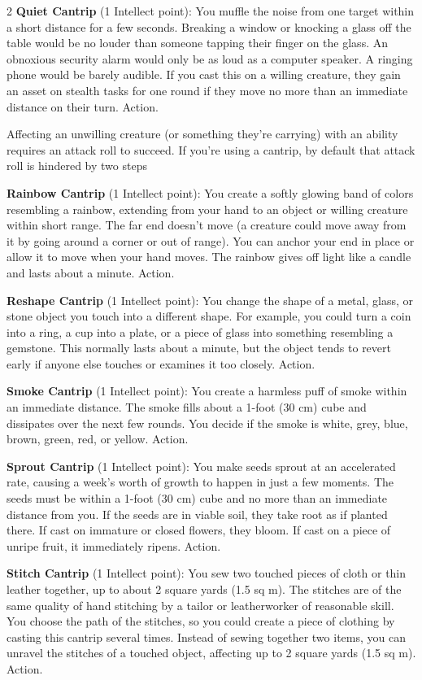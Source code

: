 \begin{multicols}{2}
\textbf{Quiet Cantrip} (1 Intellect point): You muffle the noise from one target within a short distance for a few seconds. Breaking a window or knocking a glass off the table would be no louder than someone tapping their finger on the glass. An obnoxious security alarm would only be as loud as a computer speaker. A ringing phone would be barely audible. If you cast this on a willing creature, they gain an asset on stealth tasks for one round if they move no more than an immediate distance on their turn. Action. 

Affecting an unwilling creature (or something they’re carrying) with an ability requires an attack roll to succeed. If you’re using a cantrip, by default that attack roll is hindered by two steps

\textbf{Rainbow Cantrip} (1 Intellect point): You create a softly glowing band of colors resembling a rainbow, extending from your hand to an object or willing creature within short range. The far end doesn’t move (a creature could move away from it by going around a corner or out of range). You can anchor your end in place or allow it to move when your hand moves. The rainbow gives off light like a candle and lasts about a minute. Action. 

\textbf{Reshape Cantrip} (1 Intellect point): You change the shape of a metal, glass, or stone object you touch into a different shape. For example, you could turn a coin into a ring, a cup into a plate, or a piece of glass into something resembling a gemstone. This normally lasts about a minute, but the object tends to revert early if anyone else touches or examines it too closely. Action. 

\textbf{Smoke Cantrip} (1 Intellect point): You create a harmless puff of smoke within an immediate distance. The smoke fills about a 1-foot (30 cm) cube and dissipates over the next few rounds. You decide if the smoke is white, grey, blue, brown, green, red, or yellow. Action. 

\textbf{Sprout Cantrip} (1 Intellect point): You make seeds sprout at an accelerated rate, causing a week’s worth of growth to happen in just a few moments. The seeds must be within a 1-foot (30 cm) cube and no more than an immediate distance from you. If the seeds are in viable soil, they take root as if planted there. If cast on immature or closed flowers, they bloom. If cast on a piece of unripe fruit, it immediately ripens. Action. 

\textbf{Stitch Cantrip} (1 Intellect point): You sew two touched pieces of cloth or thin leather together, up to about 2 square yards (1.5 sq m). The stitches are of the same quality of hand stitching by a tailor or leatherworker of reasonable skill. You choose the path of the stitches, so you could create a piece of clothing by casting this cantrip several times. Instead of sewing together two items, you can unravel the stitches of a touched object, affecting up to 2 square yards (1.5 sq m). Action.


\end{multicols}
